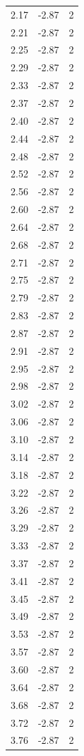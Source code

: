 \begin{longtable}{lrr}
  2.17 & -2.87 & 2 \\
  2.21 & -2.87 & 2 \\
  2.25 & -2.87 & 2 \\
  2.29 & -2.87 & 2 \\
  2.33 & -2.87 & 2 \\
  2.37 & -2.87 & 2 \\
  2.40 & -2.87 & 2 \\
  2.44 & -2.87 & 2 \\
  2.48 & -2.87 & 2 \\
  2.52 & -2.87 & 2 \\
  2.56 & -2.87 & 2 \\
  2.60 & -2.87 & 2 \\
  2.64 & -2.87 & 2 \\
  2.68 & -2.87 & 2 \\
  2.71 & -2.87 & 2 \\
  2.75 & -2.87 & 2 \\
  2.79 & -2.87 & 2 \\
  2.83 & -2.87 & 2 \\
  2.87 & -2.87 & 2 \\
  2.91 & -2.87 & 2 \\
  2.95 & -2.87 & 2 \\
  2.98 & -2.87 & 2 \\
  3.02 & -2.87 & 2 \\
  3.06 & -2.87 & 2 \\
  3.10 & -2.87 & 2 \\
  3.14 & -2.87 & 2 \\
  3.18 & -2.87 & 2 \\
  3.22 & -2.87 & 2 \\
  3.26 & -2.87 & 2 \\
  3.29 & -2.87 & 2 \\
  3.33 & -2.87 & 2 \\
  3.37 & -2.87 & 2 \\
  3.41 & -2.87 & 2 \\
  3.45 & -2.87 & 2 \\
  3.49 & -2.87 & 2 \\
  3.53 & -2.87 & 2 \\
  3.57 & -2.87 & 2 \\
  3.60 & -2.87 & 2 \\
  3.64 & -2.87 & 2 \\
  3.68 & -2.87 & 2 \\
  3.72 & -2.87 & 2 \\
  3.76 & -2.87 & 2 \\

\end{longtable}
